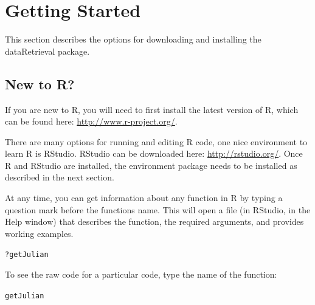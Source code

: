 \documentclass[a4paper,11pt]{article}\usepackage{graphicx, color}
\makeatletter
\newenvironment{kframe}{%
 \def\at@end@of@kframe{}%
 \ifinner\ifhmode%
  \def\at@end@of@kframe{\end{minipage}}%
  \begin{minipage}{\columnwidth}%
 \fi\fi%
 \def\FrameCommand##1{\hskip\@totalleftmargin \hskip-\fboxsep
 \colorbox{shadecolor}{##1}\hskip-\fboxsep
     \hskip-\linewidth \hskip-\@totalleftmargin \hskip\columnwidth}%
 \MakeFramed {\advance\hsize-\width
   \@totalleftmargin\z@ \linewidth\hsize
   \@setminipage}}%
 {\par\unskip\endMakeFramed%
 \at@end@of@kframe}
\newenvironment{knitrout}{}{} %
\makeatother
\begin{document}
\appendix
\section{Getting Started}
\label{sec:appendix1}
This section describes the options for downloading and installing the dataRetrieval package.

\subsection{New to R?}
If you are new to R, you will need to first install the latest version of R, which can be found here: \url{http://www.r-project.org/}.

There are many options for running and editing R code, one nice environment to learn R is RStudio. RStudio can be downloaded here: \url{http://rstudio.org/}. Once R and RStudio are installed, the environment package needs to be installed as described in the next section.

At any time, you can get information about any function in R by typing a question mark before the functions name.  This will open a file (in RStudio, in the Help window) that describes the function, the required arguments, and provides working examples.

\begin{knitrout}
\color{fgcolor}\begin{kframe}
\begin{alltt}
?getJulian
\end{alltt}
\end{kframe}
\end{knitrout}


To see the raw code for a particular code, type the name of the function:
\begin{knitrout}
\color{fgcolor}\begin{kframe}
\begin{alltt}
getJulian
\end{alltt}
\end{kframe}
\end{knitrout}



\end{document}
